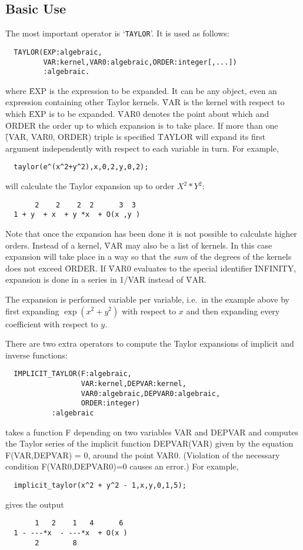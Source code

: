 
\subsection{Basic Use}

The most important operator is `\verb+TAYLOR+'. 
It is used as follows:
\hypertarget{operator:TAYLOR}{}
\begin{verbatim}
  TAYLOR(EXP:algebraic,
         VAR:kernel,VAR0:algebraic,ORDER:integer[,...])
         :algebraic.
\end{verbatim}
where \f{EXP} is the expression to be expanded. It can be any \REDUCE{}
object, even an expression containing other Taylor kernels. \f{VAR} is
the kernel with respect to which \f{EXP} is to be expanded. \f{VAR0}
denotes the point about which and \f{ORDER} the order up to which
expansion is to take place. If more than one \f{(VAR, VAR0, ORDER)} triple
is specified \f{TAYLOR} will expand its first argument independently
with respect to each variable in turn. For example,
\begin{verbatim}
  taylor(e^(x^2+y^2),x,0,2,y,0,2);
\end{verbatim}
will calculate the Taylor expansion up to order $X^{2}*Y^{2}$:
\begin{verbatim}
       2    2    2  2      3  3
  1 + y  + x  + y *x  + O(x ,y )
\end{verbatim}
Note that once the expansion has been done it is not possible to
calculate higher orders.
Instead of a kernel, \f{VAR} may also
be a list of kernels. In this case expansion will take place in a way
so that the \emph{sum} of the degrees of the kernels does not exceed
\f{ORDER}.
If \f{VAR0} evaluates to the special identifier \f{INFINITY}, expansion is
done in a series in 1/VAR instead of \f{VAR}.

The expansion is performed variable per variable, i.e.\ in the example
above by first expanding $\exp(x^{2}+y^{2})$ with respect to $x$ and
then expanding every coefficient with respect to $y$.

\hypertarget{operator:IMPLICIT_TAYLOR}{}
There are two
extra operators to compute the Taylor expansions of implicit and
inverse functions:
\begin{verbatim}
  IMPLICIT_TAYLOR(F:algebraic,
                  VAR:kernel,DEPVAR:kernel,
                  VAR0:algebraic,DEPVAR0:algebraic,
                  ORDER:integer)
           :algebraic
\end{verbatim}
takes a function F depending on two variables VAR and DEPVAR and
computes the Taylor series of the implicit function DEPVAR(VAR)
given by the equation F(VAR,DEPVAR) = 0, around the point VAR0.  
(Violation of the necessary condition F(VAR0,DEPVAR0)=0 causes an error.)
For example,
\begin{verbatim}
  implicit_taylor(x^2 + y^2 - 1,x,y,0,1,5);
\end{verbatim}
gives the output
\begin{verbatim}
       1   2    1   4      6
  1 - ---*x  - ---*x  + O(x )
       2        8
\end{verbatim}

